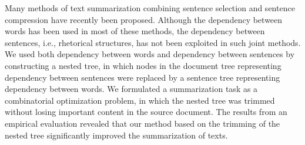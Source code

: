 Many methods of text summarization combining sentence selection and sentence compression have recently been proposed. Although the dependency between words has been used in most of these methods, the dependency between sentences, i.e., rhetorical structures, has not been exploited in such joint methods. We used both dependency between words and dependency between sentences by constructing a nested tree, in which nodes in the document tree representing dependency between sentences were replaced by a sentence tree representing dependency between words. We formulated a summarization task as a combinatorial optimization problem, in which the nested tree was trimmed without losing important content in the source document. The results from an empirical evaluation revealed that our method based on the trimming of the nested tree significantly improved the summarization of texts.
